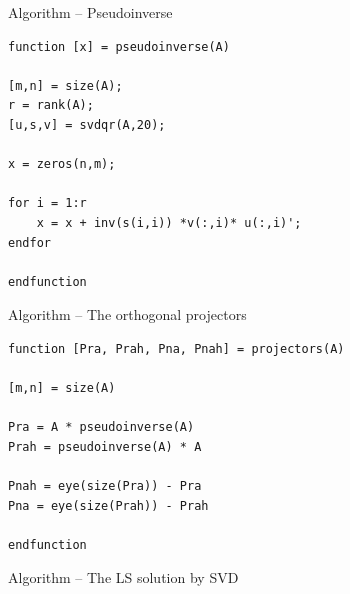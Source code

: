 \documentclass[eng,openany]{mgr}
\begin{document}
Algorithm  -- Pseudoinverse\\
\begin{lstlisting}
function [x] = pseudoinverse(A)

[m,n] = size(A);
r = rank(A);
[u,s,v] = svdqr(A,20);

x = zeros(n,m);

for i = 1:r
	x = x + inv(s(i,i)) *v(:,i)* u(:,i)';
endfor

endfunction
\end{lstlisting}
\newpage
Algorithm  -- The orthogonal projectors\\
\begin{lstlisting}
function [Pra, Prah, Pna, Pnah] = projectors(A)

[m,n] = size(A)

Pra = A * pseudoinverse(A)
Prah = pseudoinverse(A) * A

Pnah = eye(size(Pra)) - Pra
Pna = eye(size(Prah)) - Prah

endfunction
\end{lstlisting}

Algorithm  -- The LS solution by SVD\\
\end{document}
